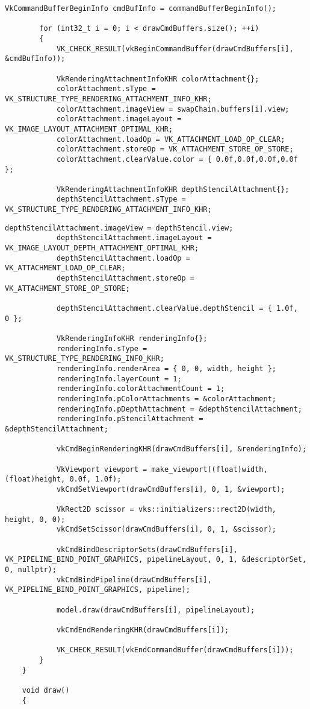 \begin{lstlisting}[caption=Обычный рендеринг]
	VkCommandBufferBeginInfo cmdBufInfo = commandBufferBeginInfo();

		for (int32_t i = 0; i < drawCmdBuffers.size(); ++i)
		{
			VK_CHECK_RESULT(vkBeginCommandBuffer(drawCmdBuffers[i], &cmdBufInfo));

			VkRenderingAttachmentInfoKHR colorAttachment{};
			colorAttachment.sType = VK_STRUCTURE_TYPE_RENDERING_ATTACHMENT_INFO_KHR;
			colorAttachment.imageView = swapChain.buffers[i].view;
			colorAttachment.imageLayout = VK_IMAGE_LAYOUT_ATTACHMENT_OPTIMAL_KHR;
			colorAttachment.loadOp = VK_ATTACHMENT_LOAD_OP_CLEAR;
			colorAttachment.storeOp = VK_ATTACHMENT_STORE_OP_STORE;
			colorAttachment.clearValue.color = { 0.0f,0.0f,0.0f,0.0f };

			VkRenderingAttachmentInfoKHR depthStencilAttachment{};
			depthStencilAttachment.sType = VK_STRUCTURE_TYPE_RENDERING_ATTACHMENT_INFO_KHR;
			\end{lstlisting}
\begin{lstlisting}[caption=Обычный рендеринг]
			depthStencilAttachment.imageView = depthStencil.view;
			depthStencilAttachment.imageLayout = VK_IMAGE_LAYOUT_DEPTH_ATTACHMENT_OPTIMAL_KHR;
			depthStencilAttachment.loadOp = VK_ATTACHMENT_LOAD_OP_CLEAR;
			depthStencilAttachment.storeOp = VK_ATTACHMENT_STORE_OP_STORE;

			depthStencilAttachment.clearValue.depthStencil = { 1.0f,  0 };

			VkRenderingInfoKHR renderingInfo{};
			renderingInfo.sType = VK_STRUCTURE_TYPE_RENDERING_INFO_KHR;
			renderingInfo.renderArea = { 0, 0, width, height };
			renderingInfo.layerCount = 1;
			renderingInfo.colorAttachmentCount = 1;
			renderingInfo.pColorAttachments = &colorAttachment;
			renderingInfo.pDepthAttachment = &depthStencilAttachment;
			renderingInfo.pStencilAttachment = &depthStencilAttachment;

			vkCmdBeginRenderingKHR(drawCmdBuffers[i], &renderingInfo);

			VkViewport viewport = make_viewport((float)width, (float)height, 0.0f, 1.0f);
			vkCmdSetViewport(drawCmdBuffers[i], 0, 1, &viewport);

			VkRect2D scissor = vks::initializers::rect2D(width, height, 0, 0);
			vkCmdSetScissor(drawCmdBuffers[i], 0, 1, &scissor);

			vkCmdBindDescriptorSets(drawCmdBuffers[i], VK_PIPELINE_BIND_POINT_GRAPHICS, pipelineLayout, 0, 1, &descriptorSet, 0, nullptr);
			vkCmdBindPipeline(drawCmdBuffers[i], VK_PIPELINE_BIND_POINT_GRAPHICS, pipeline);

			model.draw(drawCmdBuffers[i], pipelineLayout);

			vkCmdEndRenderingKHR(drawCmdBuffers[i]);

			VK_CHECK_RESULT(vkEndCommandBuffer(drawCmdBuffers[i]));
		}
	}

	void draw()
	{
	\end{lstlisting}
